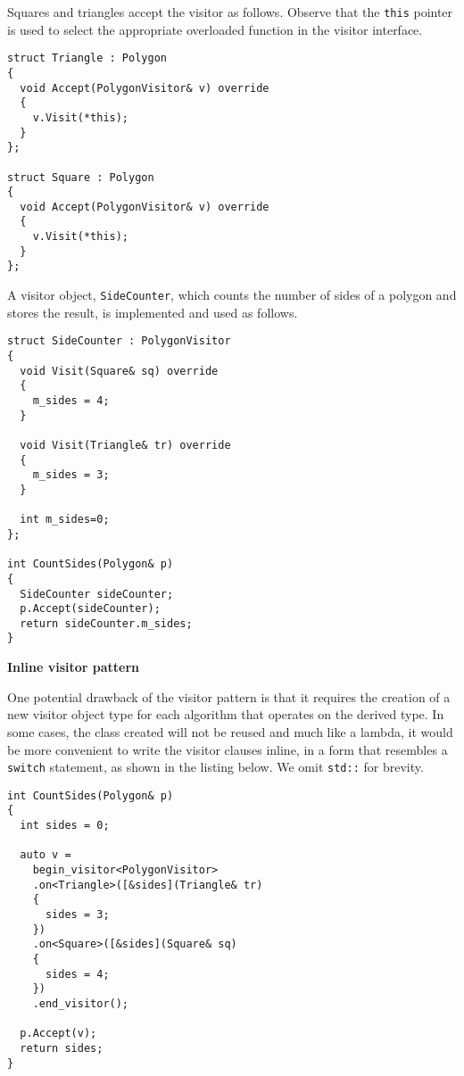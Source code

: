 \documentclass[10pt,a4paper,twocolumn]{article}
\renewcommand\section[1]{
    \begin{minipage}[c]{0.94\linewidth}
    \large \raggedright \sffamily \textbf{#1}
    \end{minipage}
}
\newcommand\mycode[1]{{\small\texttt{#1}}}
\begin{document}
Squares and triangles accept the visitor as follows. Observe that the \mycode{this} pointer is used to select the appropriate overloaded function in the visitor interface.

{\small\begin{verbatim}
struct Triangle : Polygon
{
  void Accept(PolygonVisitor& v) override
  {
    v.Visit(*this);
  }
};

struct Square : Polygon
{
  void Accept(PolygonVisitor& v) override
  {
    v.Visit(*this);
  }
};
\end{verbatim}}

A visitor object, \mycode{SideCounter}, which counts the number of sides of a polygon and stores the result, is implemented and used as follows.

{\small\begin{verbatim}
struct SideCounter : PolygonVisitor
{
  void Visit(Square& sq) override
  {
    m_sides = 4;
  }
  
  void Visit(Triangle& tr) override
  {
    m_sides = 3;
  }
  
  int m_sides=0;
};

int CountSides(Polygon& p)
{
  SideCounter sideCounter;
  p.Accept(sideCounter);
  return sideCounter.m_sides;
}
\end{verbatim}}

\section{Inline visitor pattern}

One potential drawback of the visitor pattern is that it requires the creation 
of a new visitor object type for each algorithm that operates on the derived 
type. In some cases, the class created will not be reused and much like a 
lambda, it would be more convenient to write the visitor clauses inline, in a 
form that resembles a \mycode{switch} statement, as shown in the listing 
below. We omit \mycode{std::} for brevity.

{\small\begin{verbatim}
int CountSides(Polygon& p)
{
  int sides = 0;
  
  auto v =
    begin_visitor<PolygonVisitor>
    .on<Triangle>([&sides](Triangle& tr)
    {
      sides = 3;
    })
    .on<Square>([&sides](Square& sq)
    {
      sides = 4;
    })
    .end_visitor();
  
  p.Accept(v);
  return sides;
}
\end{verbatim}}
\end{document}
